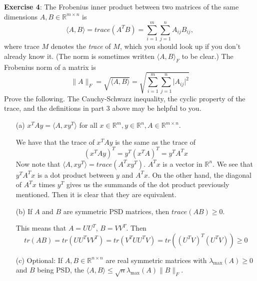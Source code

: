\documentclass{article}
\begin{document}
\textbf{Exercise 4}: The Frobenius inner product between two matrices of the same dimensions $A, B \in \mathbb{R}^{m \times n}$ is
    \begin{equation*}
        \langle A, B \rangle = trace(A^{T} B) = \sum_{i = 1}^{m} \sum_{j = 1}^{n} A_{ij}B_{ij},
    \end{equation*}
where trace $M$ denotes the \textit{trace} of $M$, which you should look up if you don't already know it. (The norm is sometimes written $\langle A, B \rangle_{F}$ to be clear.) The Frobenius norm of a matrix is 
    \begin{equation*}
        \lVert A \rVert_{F} = \sqrt{\langle A, B \rangle} = \sqrt{\sum_{i = 1}^{m} \sum_{j = 1}^{n} \lvert A_{ij} \rvert^{2}}
    \end{equation*}
Prove the following. The Cauchy-Schwarz inequality, the cyclic property of the trace, and the definitions in part $3$ above may be helpful to you.
    \begin{itemize}
        \item [(a)] $x^{T}Ay = \langle A, xy^{T} \rangle$ for all $x \in \mathbb{R}^{m}, y \in \mathbb{R}^{n}, A \in \mathbb{R}^{m \times n}$.
            \begin{answer}
                We have that the trace of $x^{T}Ay$ is the same as the trace of
                    \begin{equation*}
                        (x^{T}Ay)^{T} = y^{T}(x^{T}A)^{T} = y^{T}A^{T}x
                    \end{equation*}
                Now note that $\langle A, xy^{T} \rangle = trace(A^{T}xy^{T})$. $A^{T}x$ is a vector in $\mathbb{R}^{n}$. We see that $y^{T}A^{T}x$ is a dot product between $y$ and $A^{T}x$. On the other hand, the diagonal of $A^{T}x$ times $y^{T}$ gives us the summands of the dot product previously mentioned. Then it is clear that they are equivalent.
            \end{answer}

        \item [(b)] If $A$ and $B$ are symmetric PSD matrices, then $trace(AB) \geq 0$.
            \begin{answer}
                This means that $A = UU^{T}$, $B = VV^{T}$. Then
                    \begin{equation*}
                        tr(AB) = tr(UU^{T}VV^{T}) = tr(V^{T}UU^{T}V) = tr((U^{T}V)^{T}(U^{T}V)) \geq 0
                    \end{equation*}
            \end{answer}

        \item [(c)] Optional: If $A, B \in \mathbb{R}^{n \times n}$ are real symmetric matrices with $\lambda_{\max}(A) \geq 0$ and $B$ being PSD, the $\langle A, B \rangle \leq \sqrt{n} \lambda_{\max}(A) \lVert B \rVert_{F}$. 
    \end{itemize}
\end{document}
